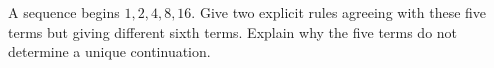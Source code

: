 A sequence begins $1,2,4,8,16$. Give two explicit rules agreeing with these five terms but giving different sixth terms. Explain why the five terms do not determine a unique continuation.
